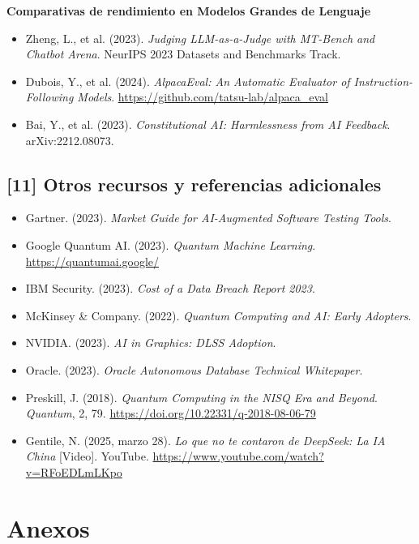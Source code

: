 \documentclass[12pt,a4paper]{report}
\numberwithin{figure}{section}
\begin{document}
\textbf{Comparativas de rendimiento en Modelos Grandes de Lenguaje}
\begin{itemize}
  \item Zheng, L., et al. (2023). \textit{Judging LLM-as-a-Judge with MT-Bench and Chatbot Arena}. NeurIPS 2023 Datasets and Benchmarks Track.
  \item Dubois, Y., et al. (2024). \textit{AlpacaEval: An Automatic Evaluator of Instruction-Following Models}. \url{https://github.com/tatsu-lab/alpaca_eval}
  \item Bai, Y., et al. (2023). \textit{Constitutional AI: Harmlessness from AI Feedback}. arXiv:2212.08073.
\end{itemize}

\section*{[11] Otros recursos y referencias adicionales}
\label{ref:11}
\begin{itemize}
  \item Gartner. (2023). \textit{Market Guide for AI-Augmented Software Testing Tools}.
  \item Google Quantum AI. (2023). \textit{Quantum Machine Learning}. \url{https://quantumai.google/}
  \item IBM Security. (2023). \textit{Cost of a Data Breach Report 2023}.
  \item McKinsey \& Company. (2022). \textit{Quantum Computing and AI: Early Adopters}.
  \item NVIDIA. (2023). \textit{AI in Graphics: DLSS Adoption}.
  \item Oracle. (2023). \textit{Oracle Autonomous Database Technical Whitepaper}.
  \item Preskill, J. (2018). \textit{Quantum Computing in the NISQ Era and Beyond}. \textit{Quantum}, 2, 79. \url{https://doi.org/10.22331/q-2018-08-06-79}
  \item Gentile, N. (2025, marzo 28). \textit{Lo que no te contaron de DeepSeek: La IA China} [Video]. YouTube. \url{https://www.youtube.com/watch?v=RFoEDLmLKpo}
\end{itemize}

\appendix
\chapter*{Anexos}
\end{document}
